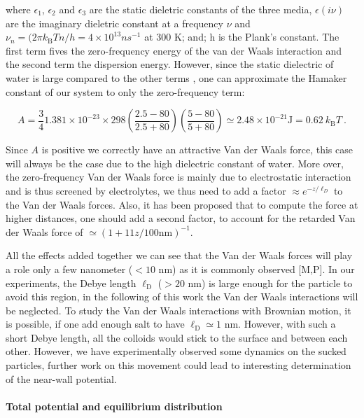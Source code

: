 where $\epsilon_1$, $\epsilon_2$ and $\epsilon_3$ are the static dieletric constants of the three media, $\epsilon (i\nu)$ are the imaginary dieletric constant at a frequency $\nu$ and $\nu_n = (2 \pi k_\mathrm{B}Tn/h = 4 \times 10^{13} n s^{-1}$ at $300$ K; and; h is the Plank's constant. The first term fives the zero-frequency energy of the van der Waals interaction and the second term the dispersion energy.
However, since the static dielectric of water is large compared to the other terms \cite{israelachvili_intermolecular_2015}, one can approximate the Hamaker constant of our system to only the zero-frequency term:

\begin{equation}
	A = \frac{3}{4} 1.381 \times 10^{-23} \times 298 
	\left(
	\frac{2.5 - 80}{2.5 + 80}
	\right)
	\left(
	\frac{5 - 80}{5 + 80}
	\right)
	\simeq
	2.48 \times 10^{-21} \mathrm{J}	= 0.62 ~ k_\mathrm{B}T ~.
\end{equation}

Since $A$ is positive we correctly have an attractive Van der Waals force, this case will always be the case due to the high dielectric constant of water. More over, the zero-frequency Van der Waals force is mainly due to electrostatic interaction and is thus screened by electrolytes, we thus need to add a factor $\approx e^{-z/\ell_D}$ to the Van der Waals forces. Also, it has been proposed \cite{gregory_approximate_1981} that to compute the force at higher distances, one should add a second factor, to account for the retarded Van der Waals force of $ \simeq (1  + 11z/100 \mathrm{nm})^{-1}$. 


All the effects added together we can see that the Van der Waals forces will play a role only a few nanometer ($< 10$ nm) as it is commonly observed [M,P]. In our experiments, the Debye length $\ell _\mathrm{D}$ ($>20$ nm) is large enough for the particle to avoid this region, in the following of this work the Van der Waals interactions will be neglected. To study the Van der Waals interactions with Brownian motion, it is possible, if one add enough salt to have $\ell_\mathrm{D} \simeq 1$ nm. However, with such a short Debye length, all the colloids would stick to the surface and between each other. However, we have experimentally observed some dynamics on the sucked particles, further work on this movement could lead to interesting determination of the near-wall potential. 

\newpage

\paragraph{Total potential and equilibrium distribution}\mbox{}\\
\label{test}
\vspace{0.10cm}

